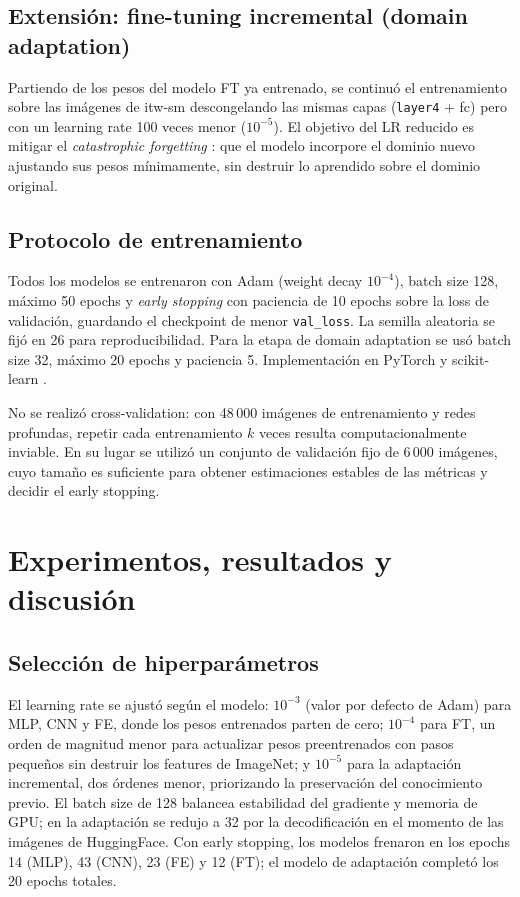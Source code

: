 \documentclass[conference]{IEEEtran}
\begin{document}
\subsection{Extensión: fine-tuning incremental (domain adaptation)}

Partiendo de los pesos del modelo FT ya entrenado, se continuó el entrenamiento sobre las imágenes de itw-sm descongelando las mismas capas (\texttt{layer4} + fc) pero con un learning rate 100 veces menor ($10^{-5}$). El objetivo del LR reducido es mitigar el \emph{catastrophic forgetting} \cite{catastrophic}: que el modelo incorpore el dominio nuevo ajustando sus pesos mínimamente, sin destruir lo aprendido sobre el dominio original.

\subsection{Protocolo de entrenamiento}

Todos los modelos se entrenaron con Adam \cite{adam} (weight decay $10^{-4}$), batch size 128, máximo 50 epochs y \emph{early stopping} con paciencia de 10 epochs sobre la loss de validación, guardando el checkpoint de menor \texttt{val\_loss}. La semilla aleatoria se fijó en 26 para reproducibilidad. Para la etapa de domain adaptation se usó batch size 32, máximo 20 epochs y paciencia 5. Implementación en PyTorch \cite{pytorch} y scikit-learn \cite{sklearn}.

No se realizó cross-validation: con 48\,000 imágenes de entrenamiento y redes profundas, repetir cada entrenamiento $k$ veces resulta computacionalmente inviable. En su lugar se utilizó un conjunto de validación fijo de 6\,000 imágenes, cuyo tamaño es suficiente para obtener estimaciones estables de las métricas y decidir el early stopping.

\section{Experimentos, resultados y discusión}

\subsection{Selección de hiperparámetros}

El learning rate se ajustó según el modelo: $10^{-3}$ (valor por defecto de Adam) para MLP, CNN y FE, donde los pesos entrenados parten de cero; $10^{-4}$ para FT, un orden de magnitud menor para actualizar pesos preentrenados con pasos pequeños sin destruir los features de ImageNet; y $10^{-5}$ para la adaptación incremental, dos órdenes menor, priorizando la preservación del conocimiento previo. El batch size de 128 balancea estabilidad del gradiente y memoria de GPU; en la adaptación se redujo a 32 por la decodificación en el momento de las imágenes de HuggingFace. Con early stopping, los modelos frenaron en los epochs 14 (MLP), 43 (CNN), 23 (FE) y 12 (FT); el modelo de adaptación completó los 20 epochs totales.
\end{document}
